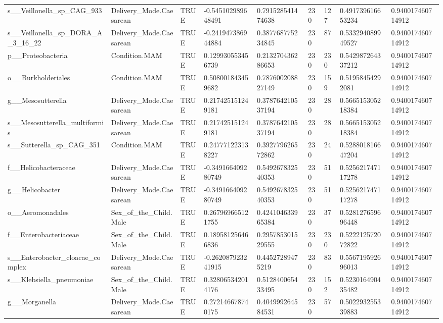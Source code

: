 \begin{longtable}{lllllllll}
s\_\_Veillonella\_sp\_CAG\_933 & Delivery\_Mode.Caesarean & TRUE & -0.545102989648491 & 0.791528541474638 & 230 & 127 & 0.491739616653234 & 0.940017460714912 \\
s\_\_Veillonella\_sp\_DORA\_A\_3\_16\_22 & Delivery\_Mode.Caesarean & TRUE & -0.241947386944884 & 0.387768775234845 & 230 & 87 & 0.533294089949527 & 0.940017460714912 \\
p\_\_Proteobacteria & Condition.MAM & TRUE & 0.129930553456739 & 0.213270436286653 & 230 & 230 & 0.542987264337212 & 0.940017460714912 \\
o\_\_Burkholderiales & Condition.MAM & TRUE & 0.508001843459682 & 0.787600208827149 & 230 & 159 & 0.51958454292081 & 0.940017460714912 \\
g\_\_Mesosutterella & Delivery\_Mode.Caesarean & TRUE & 0.217425151249181 & 0.378764210537194 & 230 & 28 & 0.566515305218384 & 0.940017460714912 \\
s\_\_Mesosutterella\_multiformis & Delivery\_Mode.Caesarean & TRUE & 0.217425151249181 & 0.378764210537194 & 230 & 28 & 0.566515305218384 & 0.940017460714912 \\
s\_\_Sutterella\_sp\_CAG\_351 & Condition.MAM & TRUE & 0.247771223138227 & 0.392779626572862 & 230 & 24 & 0.528801816647204 & 0.940017460714912 \\
f\_\_Helicobacteraceae & Delivery\_Mode.Caesarean & TRUE & -0.349166409280749 & 0.549267832540353 & 230 & 51 & 0.525621747117278 & 0.940017460714912 \\
g\_\_Helicobacter & Delivery\_Mode.Caesarean & TRUE & -0.349166409280749 & 0.549267832540353 & 230 & 51 & 0.525621747117278 & 0.940017460714912 \\
o\_\_Aeromonadales & Sex\_of\_the\_Child.Male & TRUE & 0.267969665121755 & 0.424104633965384 & 230 & 37 & 0.528127659696448 & 0.940017460714912 \\
f\_\_Enterobacteriaceae & Sex\_of\_the\_Child.Male & TRUE & 0.189581256466836 & 0.295785301529555 & 230 & 230 & 0.522212572072822 & 0.940017460714912 \\
s\_\_Enterobacter\_cloacae\_complex & Delivery\_Mode.Caesarean & TRUE & -0.262087923241915 & 0.44527289475219 & 230 & 83 & 0.556719592696013 & 0.940017460714912 \\
s\_\_Klebsiella\_pneumoniae & Sex\_of\_the\_Child.Male & TRUE & 0.328065342014176 & 0.512840065433495 & 230 & 152 & 0.523016490435482 & 0.940017460714912 \\
g\_\_Morganella & Delivery\_Mode.Caesarean & TRUE & 0.272146678740175 & 0.404999264584531 & 230 & 57 & 0.502293255339883 & 0.940017460714912 \\

\end{longtable}
